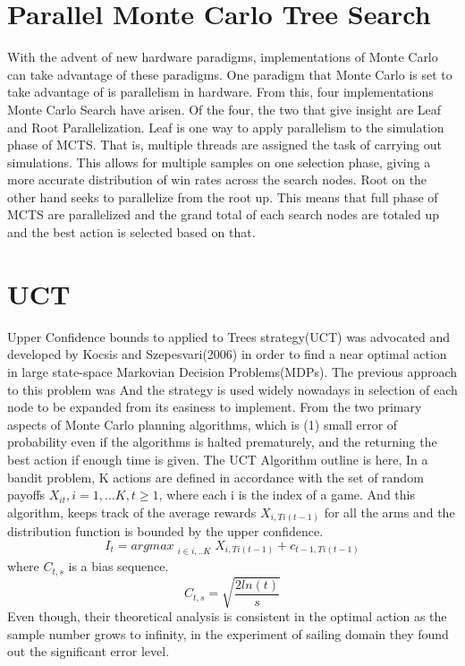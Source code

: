 \documentclass[11pt]{article}
\begin{document}
\section{Parallel Monte Carlo Tree Search}

With the advent of new hardware paradigms, implementations of Monte Carlo can take advantage of these paradigms. One paradigm that Monte Carlo is set to take advantage of is parallelism in hardware. From this, four implementations Monte Carlo Search have arisen. Of the four, the two that give insight are Leaf and Root Parallelization.\cite{chaslot2008parallel} Leaf is one way to apply parallelism to the simulation phase of MCTS. That is, multiple threads are assigned the task of carrying out simulations. This allows for multiple samples on one selection phase, giving a more accurate distribution of win rates across the search nodes. Root on the other hand seeks to parallelize from the root up. This means that full phase of MCTS are parallelized and the grand total of each search nodes are totaled up and the best action is selected based on that. 


\section{UCT}
Upper Confidence bounds to applied to Trees strategy(UCT) was advocated and developed by Kocsis and Szepesvari(2006) in order to find a near optimal action in large state-space Markovian Decision Problems(MDPs)\cite{kocsis2006bandit}. The previous approach to this problem was 
And the strategy is used widely nowadays in selection of each node to be expanded from its easiness to implement.
From the two primary aspects of Monte Carlo planning algorithms, which is (1) small error of probability even if the algorithms is halted prematurely, and the returning the best action if enough time is given. The UCT Algorithm outline is here, In a bandit problem, K actions are defined in accordance with the set of random payoffs \(X_{it}, i = 1, ... K, t\geq 1\), where each i is the index of a game. And this algorithm, keeps track of the average rewards \(X_{i, Ti(t-1)}\) for all the arms and the distribution function is bounded by the upper confidence. 
\[ I_{t} = argmax_{\substack{i \in{i, .. K}}} {X_{i, Ti(t-1)} + c_{t-1, Ti(t-1)}}\]
where \(C_{t, s}\) is a bias sequence.
\[C_{t, s} = \sqrt{\frac{2ln(t)}{s}}\]
Even though, their theoretical analysis is consistent in the optimal action as the sample number grows to infinity, in the experiment of sailing domain they found out the significant error level. 
\end{document}
